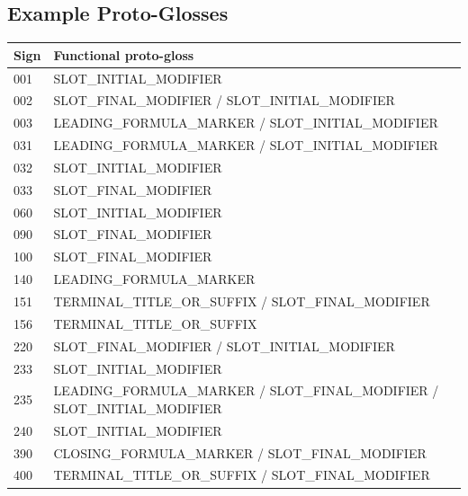 \documentclass[11pt,a4paper]{article}
\begin{document}
\subsection*{Example Proto-Glosses}
\begin{center}
\begin{tabular}{lp{}}
\toprule
\textbf{Sign} & \textbf{Functional proto-gloss} \\
\midrule
001 & SLOT\_INITIAL\_MODIFIER \\
002 & SLOT\_FINAL\_MODIFIER / SLOT\_INITIAL\_MODIFIER \\
003 & LEADING\_FORMULA\_MARKER / SLOT\_INITIAL\_MODIFIER \\
031 & LEADING\_FORMULA\_MARKER / SLOT\_INITIAL\_MODIFIER \\
032 & SLOT\_INITIAL\_MODIFIER \\
033 & SLOT\_FINAL\_MODIFIER \\
060 & SLOT\_INITIAL\_MODIFIER \\
090 & SLOT\_FINAL\_MODIFIER \\
100 & SLOT\_FINAL\_MODIFIER \\
140 & LEADING\_FORMULA\_MARKER \\
151 & TERMINAL\_TITLE\_OR\_SUFFIX / SLOT\_FINAL\_MODIFIER \\
156 & TERMINAL\_TITLE\_OR\_SUFFIX \\
220 & SLOT\_FINAL\_MODIFIER / SLOT\_INITIAL\_MODIFIER \\
233 & SLOT\_INITIAL\_MODIFIER \\
235 & LEADING\_FORMULA\_MARKER / SLOT\_FINAL\_MODIFIER / SLOT\_INITIAL\_MODIFIER \\
240 & SLOT\_INITIAL\_MODIFIER \\
390 & CLOSING\_FORMULA\_MARKER / SLOT\_FINAL\_MODIFIER \\
400 & TERMINAL\_TITLE\_OR\_SUFFIX / SLOT\_FINAL\_MODIFIER \\
\bottomrule
\end{tabular}
\end{center}
\end{document}
